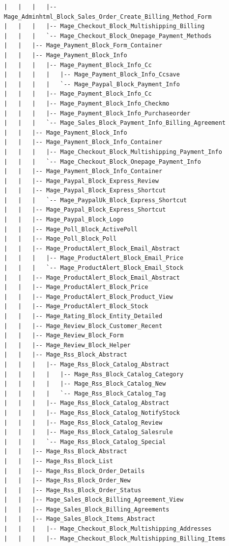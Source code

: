 \documentclass[oneside]{book}
\begin{document}
\begin{lstlisting}
|   |   |   |-- Mage_Adminhtml_Block_Sales_Order_Create_Billing_Method_Form
|   |   |   |-- Mage_Checkout_Block_Multishipping_Billing
|   |   |   `-- Mage_Checkout_Block_Onepage_Payment_Methods
|   |   |-- Mage_Payment_Block_Form_Container
|   |   |-- Mage_Payment_Block_Info
|   |   |   |-- Mage_Payment_Block_Info_Cc
|   |   |   |   |-- Mage_Payment_Block_Info_Ccsave
|   |   |   |   `-- Mage_Paypal_Block_Payment_Info
|   |   |   |-- Mage_Payment_Block_Info_Cc
|   |   |   |-- Mage_Payment_Block_Info_Checkmo
|   |   |   |-- Mage_Payment_Block_Info_Purchaseorder
|   |   |   `-- Mage_Sales_Block_Payment_Info_Billing_Agreement
|   |   |-- Mage_Payment_Block_Info
|   |   |-- Mage_Payment_Block_Info_Container
|   |   |   |-- Mage_Checkout_Block_Multishipping_Payment_Info
|   |   |   `-- Mage_Checkout_Block_Onepage_Payment_Info
|   |   |-- Mage_Payment_Block_Info_Container
|   |   |-- Mage_Paypal_Block_Express_Review
|   |   |-- Mage_Paypal_Block_Express_Shortcut
|   |   |   `-- Mage_PaypalUk_Block_Express_Shortcut
|   |   |-- Mage_Paypal_Block_Express_Shortcut
|   |   |-- Mage_Paypal_Block_Logo
|   |   |-- Mage_Poll_Block_ActivePoll
|   |   |-- Mage_Poll_Block_Poll
|   |   |-- Mage_ProductAlert_Block_Email_Abstract
|   |   |   |-- Mage_ProductAlert_Block_Email_Price
|   |   |   `-- Mage_ProductAlert_Block_Email_Stock
|   |   |-- Mage_ProductAlert_Block_Email_Abstract
|   |   |-- Mage_ProductAlert_Block_Price
|   |   |-- Mage_ProductAlert_Block_Product_View
|   |   |-- Mage_ProductAlert_Block_Stock
|   |   |-- Mage_Rating_Block_Entity_Detailed
|   |   |-- Mage_Review_Block_Customer_Recent
|   |   |-- Mage_Review_Block_Form
|   |   |-- Mage_Review_Block_Helper
|   |   |-- Mage_Rss_Block_Abstract
|   |   |   |-- Mage_Rss_Block_Catalog_Abstract
|   |   |   |   |-- Mage_Rss_Block_Catalog_Category
|   |   |   |   |-- Mage_Rss_Block_Catalog_New
|   |   |   |   `-- Mage_Rss_Block_Catalog_Tag
|   |   |   |-- Mage_Rss_Block_Catalog_Abstract
|   |   |   |-- Mage_Rss_Block_Catalog_NotifyStock
|   |   |   |-- Mage_Rss_Block_Catalog_Review
|   |   |   |-- Mage_Rss_Block_Catalog_Salesrule
|   |   |   `-- Mage_Rss_Block_Catalog_Special
|   |   |-- Mage_Rss_Block_Abstract
|   |   |-- Mage_Rss_Block_List
|   |   |-- Mage_Rss_Block_Order_Details
|   |   |-- Mage_Rss_Block_Order_New
|   |   |-- Mage_Rss_Block_Order_Status
|   |   |-- Mage_Sales_Block_Billing_Agreement_View
|   |   |-- Mage_Sales_Block_Billing_Agreements
|   |   |-- Mage_Sales_Block_Items_Abstract
|   |   |   |-- Mage_Checkout_Block_Multishipping_Addresses
|   |   |   |-- Mage_Checkout_Block_Multishipping_Billing_Items

\end{lstlisting}
\end{document}
